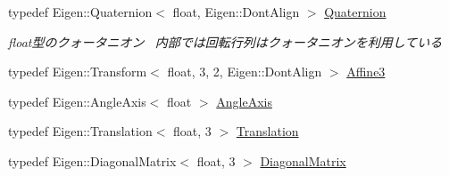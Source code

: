 \begin{DoxyCompactItemize}
typedef Eigen\+::\+Quaternion$<$ float, Eigen\+::\+Dont\+Align $>$ \mbox{\hyperlink{namespace_k___math_a9bc4dcabcbd509e9dc53ae0ecb07a17c}{Quaternion}}
\begin{DoxyCompactList}\small\item\em float型のクォータニオン~\newline
内部では回転行列はクォータニオンを利用している \end{DoxyCompactList}\item 
typedef Eigen\+::\+Transform$<$ float, 3, 2, Eigen\+::\+Dont\+Align $>$ \mbox{\hyperlink{namespace_k___math_a1de8cd5bcdc049291da842729bf45aeb}{Affine3}}
\item 
typedef Eigen\+::\+Angle\+Axis$<$ float $>$ \mbox{\hyperlink{namespace_k___math_a0f5db7b05f161215069d86bce9dac011}{Angle\+Axis}}
\item 
typedef Eigen\+::\+Translation$<$ float, 3 $>$ \mbox{\hyperlink{namespace_k___math_a9a67bf2cbf95f0824bee5e5f79570ba4}{Translation}}
\item 
typedef Eigen\+::\+Diagonal\+Matrix$<$ float, 3 $>$ \mbox{\hyperlink{namespace_k___math_aff8bcbdc2a06207d456cb31f4d72d861}{Diagonal\+Matrix}}
\end{DoxyCompactItemize}
